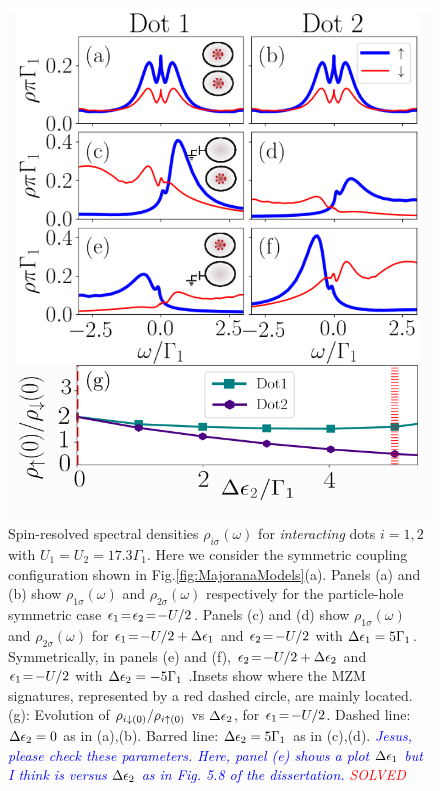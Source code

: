 \documentclass[showpacs,aps,prb,reprint,superscriptaddress]{revtex4-2}
\newcommand{\LUIS}[1]{\textcolor{blue}{\fbox{Luis} {\sl#1}}}
\newcommand{\Jesus}[1]{\textcolor{red}{\fbox{Jesus} {\sl#1}}}
\begin{document}
\begin{figure}[bt]
\begin{center}
\includegraphics[scale=0.45]{Graficos/N2t1=t2.png}
\caption{ \label{fig:Nt1=t2} Spin-resolved spectral densities  $\rho_{i \sigma}(\omega)$ for \textit{interacting}  dots $i=1,2$ with $U_1\!=\!U_2\!=\!17.3 \Gamma_1$. Here we consider the symmetric coupling configuration shown in Fig.\ref{fig:MajoranaModels}(a). Panels (a) and (b) show $\rho_{1 \sigma}(\omega)$ and $\rho_{2 \sigma}(\omega)$ respectively for the particle-hole symmetric case $\epsilon_1\!=\!\epsilon_2\!=\!-U/2$. Panels (c) and (d) show $\rho_{1 \sigma}(\omega)$ and $\rho_{2 \sigma}(\omega)$ for $\epsilon_1\!=\!-U/2+\Delta \epsilon_1$ and $\epsilon_2\!=\!-U/2$ with $\Delta \epsilon_1=5\Gamma_1$.  Symmetrically, in panels (e) and (f), $\epsilon_2\!=\!-U/2+\Delta \epsilon_2$ and $\epsilon_1\!=\!-U/2$ with $\Delta \epsilon_2=-5\Gamma_1$ .Insets show where the MZM signatures, represented by a red dashed circle, are mainly located.  (g): Evolution of $\rho_{i \downarrow(0)}/\rho_{i \uparrow(0)}$ vs $\Delta \epsilon_2$, for $\epsilon_1\!=\!-U/2$. Dashed line: $\Delta \epsilon_2 =0$ as in (a),(b). Barred  line: $\Delta \epsilon_2 =5\Gamma_1$ as in (c),(d). 
 \LUIS{Jesus, please check these parameters. Here, panel (e) shows a  plot $\Delta \epsilon_1$ but I think is versus $\Delta \epsilon_2$ as in Fig. 5.8 of the dissertation.} \Jesus{SOLVED}
}
%
\end{center}
\end{figure}
\end{document}
